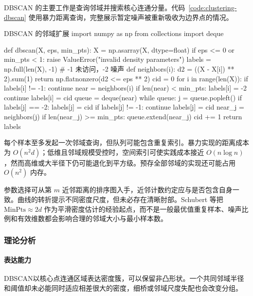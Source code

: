 DBSCAN 的主要工作是查询邻域并搜索核心连通分量。代码~\ref{code:clustering-dbscan} 使用暴力距离查询，完整展示暂定噪声被重新吸收为边界点的情况。

\begin{codeblock}[language=Python,label={code:clustering-dbscan}]{DBSCAN 的邻域扩展}
import numpy as np
from collections import deque

def dbscan(X, eps, min_pts):
    X = np.asarray(X, dtype=float)
    if eps <= 0 or min_pts < 1:
        raise ValueError("invalid density parameters")
    labels = np.full(len(X), -1)  # -1 未访问，-2 噪声
    def neighbors(i):
        d2 = ((X - X[i]) ** 2).sum(1)
        return np.flatnonzero(d2 <= eps ** 2)
    cid = 0
    for i in range(len(X)):
        if labels[i] != -1:
            continue
        near = neighbors(i)
        if len(near) < min_pts:
            labels[i] = -2
            continue
        labels[i] = cid
        queue = deque(near)
        while queue:
            j = queue.popleft()
            if labels[j] == -2:
                labels[j] = cid
            if labels[j] != -1:
                continue
            labels[j] = cid
            near_j = neighbors(j)
            if len(near_j) >= min_pts:
                queue.extend(near_j)
        cid += 1
    return labels
\end{codeblock}

每个样本至多发起一次邻域查询，但队列可能包含重复索引。暴力实现的距离成本为 $O(n^2d)$；低维且邻域规模受控时，空间索引可使实践成本接近 $O(n\log n)$，然而高维或大半径下仍可能退化到平方级。预存全部邻域的实现还可能占用 $O(n^2)$ 内存。

参数选择可从第 $m$ 近邻距离的排序图入手，近邻计数约定应与是否包含自身一致。曲线的转折提示不同密度尺度，但未必存在清晰肘部。Schubert 等把 $\mathrm{MinPts}\approx 2d$ 作为平滑密度估计的经验起点，而不是一般最优值重复样本、噪声比例和有效维数都会影响合理的邻域大小与最小样本数。

\subsubsection{理论分析}

\paragraph{表达能力}
DBSCAN以核心点连通区域表达密度簇，可以保留非凸形状。一个共同邻域半径和阈值却未必能同时适应相差很大的密度，细桥或邻域尺度失配也会改变分组。

